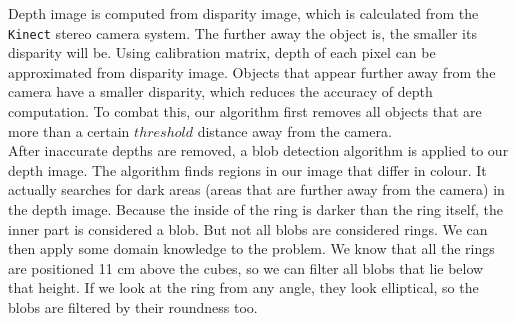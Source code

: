 \documentclass[12pt,a4paper]{article}
\begin{document}
	Depth image is computed from disparity image, which is calculated from the \texttt{Kinect} stereo camera system. The further away the object is, the smaller its disparity will be. Using calibration matrix, depth of each pixel can be approximated from disparity image. Objects that appear further away from the camera have a smaller disparity, which reduces the accuracy of depth computation. To combat this, our algorithm first removes all objects that are more than a certain $threshold$ distance away from the camera. \\
	
	After inaccurate depths are removed, a blob detection algorithm is applied to our depth image. The algorithm finds regions in our image that differ in colour. It actually searches for dark areas (areas that are further away from the camera) in the depth image. Because the inside of the ring is darker than the ring itself, the inner part is considered a blob. But not all blobs are considered rings. We can then apply some domain knowledge to the problem. We know that all the rings are positioned 11 cm above the cubes, so we can filter all blobs that lie below that height. If we look at the ring from any angle, they look elliptical, so the blobs are filtered by their roundness too. \\
	
\end{document}
